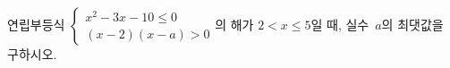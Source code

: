 연립부등식 $\begin{cases} x^2-3x-10\le 0 \\ (x-2)(x-a)>0 \end{cases}$의 해가 $2<x\le 5$일 때, 실수~$a$의 최댓값을 구하시오.

